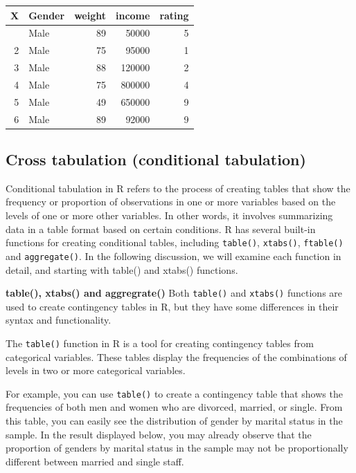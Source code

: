 \documentclass[
]{article}
\begin{document}
\begin{longtable}[]{@{}rlrrr@{}}
\toprule\noalign{}
X & Gender & weight & income & rating \\
\midrule\noalign{}
\endhead
\bottomrule\noalign{}
\endlastfoot
1 & Male & 89 & 50000 & 5 \\
2 & Male & 75 & 95000 & 1 \\
3 & Male & 88 & 120000 & 2 \\
4 & Male & 75 & 800000 & 4 \\
5 & Male & 49 & 650000 & 9 \\
6 & Male & 89 & 92000 & 9 \\
\end{longtable}

\hypertarget{cross-tabulation-conditional-tabulation}{%
\subsection{Cross tabulation (conditional
tabulation)}\label{cross-tabulation-conditional-tabulation}}

Conditional tabulation in R refers to the process of creating tables
that show the frequency or proportion of observations in one or more
variables based on the levels of one or more other variables. In other
words, it involves summarizing data in a table format based on certain
conditions. R has several built-in functions for creating conditional
tables, including \texttt{table()}, \texttt{xtabs()}, \texttt{ftable()}
and \texttt{aggregate()}. In the following discussion, we will examine
each function in detail, and starting with table() and xtabs()
functions.

\textbf{table(), xtabs() and aggregrate()} Both \texttt{table()} and
\texttt{xtabs()} functions are used to create contingency tables in R,
but they have some differences in their syntax and functionality.

The \texttt{table()} function in R is a tool for creating contingency
tables from categorical variables. These tables display the frequencies
of the combinations of levels in two or more categorical variables.

For example, you can use \texttt{table()} to create a contingency table
that shows the frequencies of both men and women who are divorced,
married, or single. From this table, you can easily see the distribution
of gender by marital status in the sample. In the result displayed
below, you may already observe that the proportion of genders by marital
status in the sample may not be proportionally different between married
and single staff.
\end{document}
